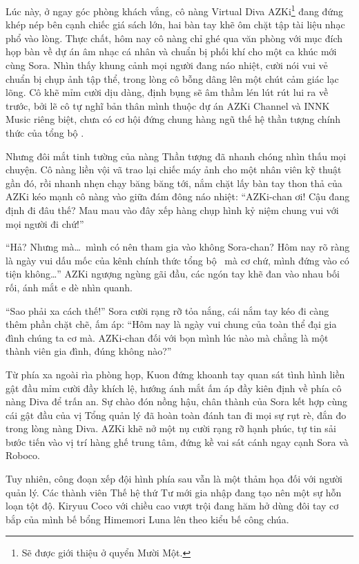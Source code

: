 \documentclass[../main.tex]{subfiles}
\begin{document}

Lúc này, ở ngay góc phòng khách vắng, cô nàng Virtual Diva AZKi\footnote{Sẽ được giới thiệu ở quyển Mười Một.} đang đứng khép nép bên cạnh chiếc giá sách lớn, hai bàn tay khẽ ôm chặt tập tài liệu nhạc phổ vào lòng. Thực chất, hôm nay cô nàng chỉ ghé qua văn phòng với mục đích họp bàn về dự án âm nhạc cá nhân và chuẩn bị phối khí cho một ca khúc mới cùng Sora. Nhìn thấy khung cảnh mọi người đang náo nhiệt, cười nói vui vẻ chuẩn bị chụp ảnh tập thể, trong lòng cô bỗng dâng lên một chút cảm giác lạc lõng. Cô khẽ mỉm cười dịu dàng, định bụng sẽ âm thầm lén lút rút lui ra về trước, bởi lẽ cô tự nghĩ bản thân mình thuộc dự án AZKi Channel và INNK Music riêng biệt, chưa có cơ hội đứng chung hàng ngũ thế hệ thần tượng chính thức của tổng bộ \hll.

Nhưng đôi mắt tinh tường của nàng Thần tượng đã nhanh chóng nhìn thấu mọi chuyện. Cô nàng liền vội vã trao lại chiếc máy ảnh cho một nhân viên kỹ thuật gần đó, rồi nhanh nhẹn chạy băng băng tới, nắm chặt lấy bàn tay thon thả của AZKi kéo mạnh cô nàng vào giữa đám đông náo nhiệt: ``AZKi-chan ơi! Cậu đang định đi đâu thế? Mau mau vào đây xếp hàng chụp hình kỷ niệm chung vui với mọi người đi chứ!''

``Hả? Nhưng mà\dots\ mình có nên tham gia vào không Sora-chan? Hôm nay rõ ràng là ngày vui dấu mốc của kênh chính thức tổng bộ \hll\ mà cơ chứ, mình đứng vào có tiện không\dots'' AZKi ngượng ngùng gãi đầu, các ngón tay khẽ đan vào nhau bối rối, ánh mắt e dè nhìn quanh.

``Sao phải xa cách thế!'' Sora cười rạng rỡ tỏa nắng, cái nắm tay kéo đi càng thêm phần chặt chẽ, ấm áp: ``Hôm nay là ngày vui chung của toàn thể đại gia đình chúng ta cơ mà. AZKi-chan đối với bọn mình lúc nào mà chẳng là một thành viên gia đình, đúng không nào?''

Từ phía xa ngoài rìa phòng họp, Kuon đứng khoanh tay quan sát tình hình liền gật đầu mỉm cười đầy khích lệ, hướng ánh mắt ấm áp đầy kiên định về phía cô nàng Diva để trấn an. Sự chào đón nồng hậu, chân thành của Sora kết hợp cùng cái gật đầu của vị Tổng quản lý đã hoàn toàn đánh tan đi mọi sự rụt rè, đắn đo trong lòng nàng Diva. AZKi khẽ nở một nụ cười rạng rỡ hạnh phúc, tự tin sải bước tiến vào vị trí hàng ghế trung tâm, đứng kề vai sát cánh ngay cạnh Sora và Roboco.

Tuy nhiên, công đoạn xếp đội hình phía sau vẫn là một thảm họa đối với người quản lý. Các thành viên Thế hệ thứ Tư mới gia nhập đang tạo nên một sự hỗn loạn tột độ. Kiryuu Coco với chiều cao vượt trội đang hăm hở dùng đôi tay cơ bắp của mình bế bổng Himemori Luna lên theo kiểu bế công chúa.
\end{document}
